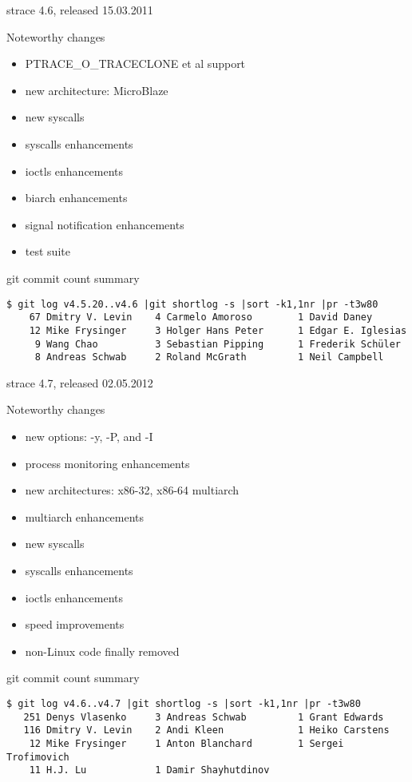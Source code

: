 \documentclass[unicode]{beamer}
\begin{document}
\begin{frame}[fragile]{strace 4.6, released 15.03.2011}
	\begin{block}{Noteworthy changes}
	\begin{itemize}
		\item PTRACE\_O\_TRACECLONE et al support
		\item new architecture: MicroBlaze
		\item new syscalls
		\item syscalls enhancements
		\item ioctls enhancements
		\item biarch enhancements
		\item signal notification enhancements
		\item test suite
	\end{itemize}
	\end{block}
	\begin{block}{git commit count summary}
	\scriptsize
\begin{verbatim}
$ git log v4.5.20..v4.6 |git shortlog -s |sort -k1,1nr |pr -t3w80
    67 Dmitry V. Levin    4 Carmelo Amoroso        1 David Daney
    12 Mike Frysinger     3 Holger Hans Peter      1 Edgar E. Iglesias
     9 Wang Chao          3 Sebastian Pipping      1 Frederik Schüler
     8 Andreas Schwab     2 Roland McGrath         1 Neil Campbell
\end{verbatim}
	\end{block}
\end{frame}

\begin{frame}[fragile]{strace 4.7, released 02.05.2012}
	\begin{block}{Noteworthy changes}
	\begin{itemize}
		\item new options: -y, -P, and -I
		\item process monitoring enhancements
		\item new architectures: x86-32, x86-64 multiarch
		\item multiarch enhancements
		\item new syscalls
		\item syscalls enhancements
		\item ioctls enhancements
		\item speed improvements
		\item non-Linux code finally removed
	\end{itemize}
	\end{block}
	\begin{block}{git commit count summary}
	\scriptsize
\begin{verbatim}
$ git log v4.6..v4.7 |git shortlog -s |sort -k1,1nr |pr -t3w80
   251 Denys Vlasenko     3 Andreas Schwab         1 Grant Edwards
   116 Dmitry V. Levin    2 Andi Kleen             1 Heiko Carstens
    12 Mike Frysinger     1 Anton Blanchard        1 Sergei Trofimovich
    11 H.J. Lu            1 Damir Shayhutdinov
\end{verbatim}
	\end{block}
\end{frame}
\end{document}
